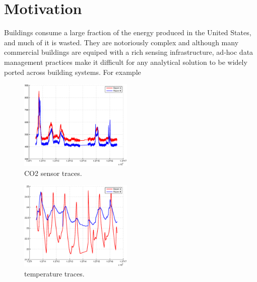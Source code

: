 \section{Motivation}
Buildings consume a large fraction of the energy produced in the United States, and much of it
is wasted\cite{epa}.  They are notoriously complex and although many commercial 
buildings are equiped with a rich sensing infrastructure, ad-hoc data management practices
make it difficult for any analytical solution to be widely ported across building
systems.  For example
%




\begin{figure}[h!]
\centering
    \includegraphics[width=0.48\textwidth]{figs/co2_pair.eps}
    \caption{CO2 sensor traces.}
\label{fig:co2traces}
\end{figure}

\begin{figure}[h!]
\centering
    \includegraphics[width=0.48\textwidth]{figs/temp_pair.eps}
    \caption{temperature traces.}
\label{fig:temptraces}
\end{figure}


